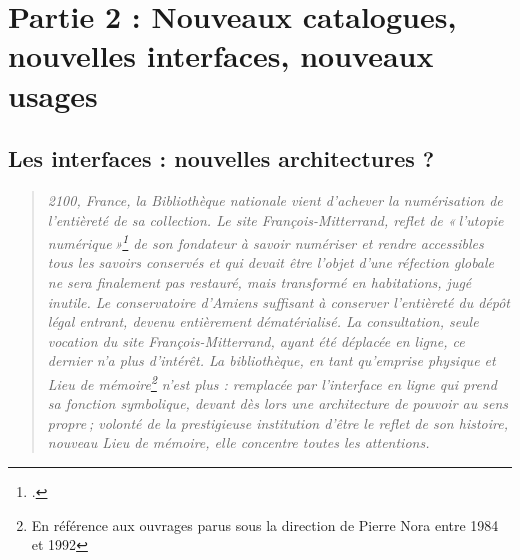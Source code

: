 


\part{Partie 2 : Nouveaux catalogues, nouvelles interfaces, nouveaux usages}




\chapter{Les interfaces : nouvelles architectures ?}
\begin{quote}
	\textit{2100, France, la Bibliothèque nationale vient d’achever la numérisation de l’entièreté de sa collection. Le site François-Mitterrand, reflet de « l’utopie numérique »\footcite[p. 20]{bermes2024} de son fondateur à savoir numériser et rendre accessibles tous les savoirs conservés et qui devait être l’objet d’une réfection globale ne sera finalement pas restauré, mais transformé en habitations, jugé inutile. Le conservatoire d’Amiens suffisant à conserver l’entièreté du dépôt légal entrant, devenu entièrement dématérialisé. La consultation, seule vocation du site François-Mitterrand, ayant été déplacée en ligne, ce dernier n'a plus d'intérêt. La bibliothèque, en tant qu’emprise physique et Lieu de mémoire\footnote{En référence aux ouvrages parus sous la direction de Pierre Nora entre 1984 et 1992} n’est plus : remplacée par l’interface en ligne qui prend sa fonction symbolique, devant dès lors une architecture de pouvoir au sens propre ; volonté de la prestigieuse institution d’être le reflet de son histoire, nouveau Lieu de mémoire, elle concentre toutes les attentions.}
\end{quote}

